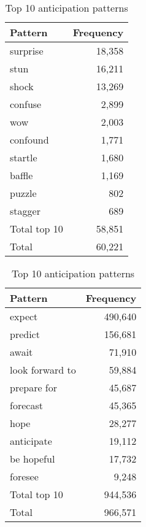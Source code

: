 \begin{table}[!htb]
    \begin{minipage}{.45\linewidth}
		\centering
		\begin{tabular}{l|r}
			{\bf Pattern} & {\bf Frequency} \\\hline
			surprise      & 18,358          \\
			stun          & 16,211          \\
			shock         & 13,269          \\
			confuse       & 2,899           \\
			wow           & 2,003           \\
			confound      & 1,771           \\
			startle       & 1,680           \\
			baffle        & 1,169           \\
			puzzle        & 802             \\
			stagger       & 689             \\\hline
			Total top 10  & 58,851          \\
			Total         & 60,221         
		\end{tabular}
		\caption{Top 10 surprise patterns}
		\label{tab:surprise-patterns}
	\end{minipage}
	\begin{minipage}{.45\linewidth}
		\centering
		\begin{tabular}{l|r}
			{\bf Pattern}   & {\bf Frequency} \\\hline
			expect          & 490,640         \\
			predict         & 156,681         \\
			await           & 71,910          \\
			look forward to & 59,884          \\
			prepare for     & 45,687          \\
			forecast        & 45,365          \\
			hope            & 28,277          \\
			anticipate      & 19,112          \\
			be hopeful      & 17,732          \\
			foresee         & 9,248           \\\hline
			Total top 10    & 944,536         \\
			Total           & 966,571        
		\end{tabular}
		\caption{Top 10 anticipation patterns}
		\label{tab:anticipation-patterns}
	\end{minipage}
\end{table}

